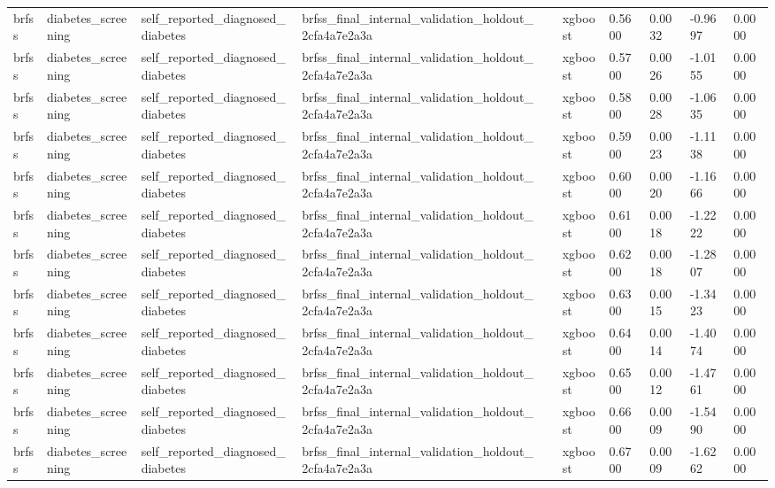 \begin{tabular}{llllllllll}
brfss & diabetes\_screening & self\_reported\_diagnosed\_diabetes & brfss\_final\_internal\_validation\_holdout\_2cfa4a7e2a3a &  & xgboost & 0.5600 & 0.0032 & -0.9697 & 0.0000 \\
brfss & diabetes\_screening & self\_reported\_diagnosed\_diabetes & brfss\_final\_internal\_validation\_holdout\_2cfa4a7e2a3a &  & xgboost & 0.5700 & 0.0026 & -1.0155 & 0.0000 \\
brfss & diabetes\_screening & self\_reported\_diagnosed\_diabetes & brfss\_final\_internal\_validation\_holdout\_2cfa4a7e2a3a &  & xgboost & 0.5800 & 0.0028 & -1.0635 & 0.0000 \\
brfss & diabetes\_screening & self\_reported\_diagnosed\_diabetes & brfss\_final\_internal\_validation\_holdout\_2cfa4a7e2a3a &  & xgboost & 0.5900 & 0.0023 & -1.1138 & 0.0000 \\
brfss & diabetes\_screening & self\_reported\_diagnosed\_diabetes & brfss\_final\_internal\_validation\_holdout\_2cfa4a7e2a3a &  & xgboost & 0.6000 & 0.0020 & -1.1666 & 0.0000 \\
brfss & diabetes\_screening & self\_reported\_diagnosed\_diabetes & brfss\_final\_internal\_validation\_holdout\_2cfa4a7e2a3a &  & xgboost & 0.6100 & 0.0018 & -1.2222 & 0.0000 \\
brfss & diabetes\_screening & self\_reported\_diagnosed\_diabetes & brfss\_final\_internal\_validation\_holdout\_2cfa4a7e2a3a &  & xgboost & 0.6200 & 0.0018 & -1.2807 & 0.0000 \\
brfss & diabetes\_screening & self\_reported\_diagnosed\_diabetes & brfss\_final\_internal\_validation\_holdout\_2cfa4a7e2a3a &  & xgboost & 0.6300 & 0.0015 & -1.3423 & 0.0000 \\
brfss & diabetes\_screening & self\_reported\_diagnosed\_diabetes & brfss\_final\_internal\_validation\_holdout\_2cfa4a7e2a3a &  & xgboost & 0.6400 & 0.0014 & -1.4074 & 0.0000 \\
brfss & diabetes\_screening & self\_reported\_diagnosed\_diabetes & brfss\_final\_internal\_validation\_holdout\_2cfa4a7e2a3a &  & xgboost & 0.6500 & 0.0012 & -1.4761 & 0.0000 \\
brfss & diabetes\_screening & self\_reported\_diagnosed\_diabetes & brfss\_final\_internal\_validation\_holdout\_2cfa4a7e2a3a &  & xgboost & 0.6600 & 0.0009 & -1.5490 & 0.0000 \\
brfss & diabetes\_screening & self\_reported\_diagnosed\_diabetes & brfss\_final\_internal\_validation\_holdout\_2cfa4a7e2a3a &  & xgboost & 0.6700 & 0.0009 & -1.6262 & 0.0000 \\

\end{tabular}
